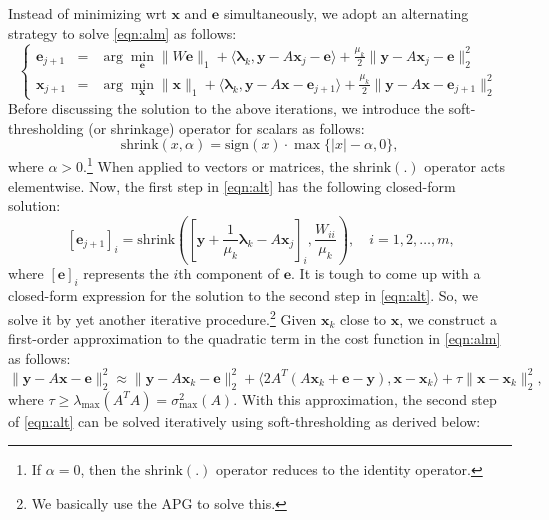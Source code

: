 \documentclass{article}
\newcommand{\x}{\mathbf{x}}
\newcommand{\y}{\mathbf{y}}
\newcommand{\e}{\mathbf{e}}
\newcommand{\bl}{\boldsymbol{\lambda}}
\newcommand{\sh}{\mathrm{shrink}}
\newcommand{\sgn}{\mathrm{sign}}
\begin{document}
\smallbreak
Instead of minimizing wrt $\x$ and $\e$ simultaneously, we adopt an alternating strategy to solve \eqref{eqn:alm} as follows:
\begin{equation}
\left \{
\begin{array}{lll}
\e_{j+1} & = & \arg \min_\e  \|W\e\|_1 + \langle \bl_k, \y - A\x_j - \e \rangle + \frac{\mu_k}{2}\|\y - A\x_j - \e\|_2^2 \\
\x_{j+1} & = & \arg \min_\x \|\x\|_1 + \langle \bl_k, \y - A\x - \e_{j+1} \rangle + \frac{\mu_k}{2}\|\y - A\x - \e_{j+1}\|_2^2
\end{array}
\right .
\label{eqn:alt}
\end{equation}
Before discussing the solution to the above iterations, we introduce the soft-thresholding (or shrinkage) operator for scalars as follows:
\begin{equation}
\sh(x,\alpha) = \sgn(x)\cdot \max\{|x| - \alpha, 0\},
\end{equation}
where $\alpha > 0$.\footnote{If $\alpha = 0$, then the $\sh(.)$ operator reduces to the identity operator.} When applied to vectors or matrices, the $\sh(.)$ operator acts elementwise. 
\smallbreak
Now, the first step in \eqref{eqn:alt} has the following closed-form solution:
\begin{equation}
\,[\e_{j+1}]_i  =  \sh \left(\left[ \y + \frac{1}{\mu_k}\bl_k - A\x_j \right] _i, \frac{W_{ii}}{\mu_k}\right), \quad i = 1,2,\ldots,m,
\end{equation}
where $[\e]_i$ represents the $i$th component of $\e$.
\smallbreak
It is tough to come up with a closed-form expression for the solution to the second step in \eqref{eqn:alt}. So, we solve it by yet another iterative procedure.\footnote{We basically use the APG to solve this.} Given $\x_k$ close to $\x$, we construct a first-order approximation to the quadratic term in the cost function in \eqref{eqn:alm} as follows:
\begin{equation}
\|\y - A\x - \e\|_2^2 \approx \|\y - A\x_k - \e\|_2^2 + \langle 2A^T(A\x_k+\e-\y), \x - \x_k \rangle + \tau\|\x-\x_k\|_2^2,
\end{equation}
where $\tau \geq \lambda_\mathrm{max} (A^TA) = \sigma^2_\mathrm{max}(A)$. With this approximation, the second step of \eqref{eqn:alt} can be solved iteratively using soft-thresholding as derived below:
\end{document}

